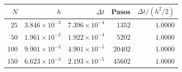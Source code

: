 \begin{tabular}{r r r r r}
\toprule
\rowcolor{Azul1!50}
$N$ & $h$ & $\Delta t$ & Pasos & $\Delta t/(h^2/2)$ \\
\midrule
$25$ & $3.846\times10^{-2}$ & $7.396\times10^{-4}$ & $1352$ & $1.0000$ \\
$50$ & $1.961\times10^{-2}$ & $1.922\times10^{-4}$ & $5202$ & $1.0000$ \\
$100$ & $9.901\times10^{-3}$ & $4.901\times10^{-5}$ & $20402$ & $1.0000$ \\
$150$ & $6.623\times10^{-3}$ & $2.193\times10^{-5}$ & $45602$ & $1.0000$ \\
\bottomrule
\end{tabular}
